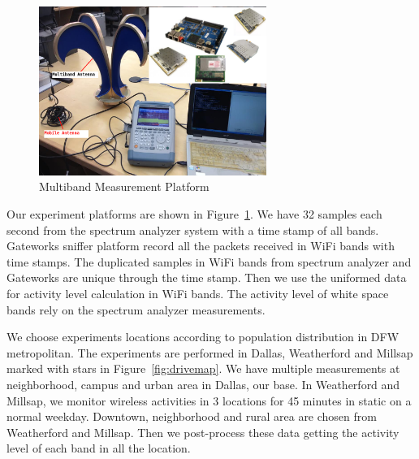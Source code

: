   \begin{figure}
  \centering
  \includegraphics[width=74mm]{figures/equipment}
  \vspace{-0.1in}
  \caption{Multiband Measurement Platform}
  \label{fig:equipment}
  \vspace{-0.15in}
  \end{figure}
  
Our experiment platforms are shown in Figure~\ref{fig:equipment}.
We have 32 samples each second from the spectrum analyzer system with a time stamp of all bands.
Gateworks sniffer platform record all the packets received in WiFi bands with time stamps. The duplicated 
samples in WiFi bands from spectrum analyzer and Gateworks are unique through the time stamp. 
Then we use the uniformed data for activity level calculation in WiFi bands. The activity level 
of white space bands rely on the spectrum analyzer measurements.  

We choose experiments locations according to population distribution in DFW metropolitan. 
The experiments are performed in Dallas, Weatherford and Millsap marked with stars in Figure~\ref{fig:drivemap}.
We have multiple measurements at neighborhood, campus and urban area in Dallas, our base.
In Weatherford and Millsap, we monitor wireless activities in 3 locations for 45 minutes in 
static on a normal weekday. Downtown, neighborhood and rural area are chosen from Weatherford and Millsap. 
Then we post-process these data getting the activity level of each band in all the location.


